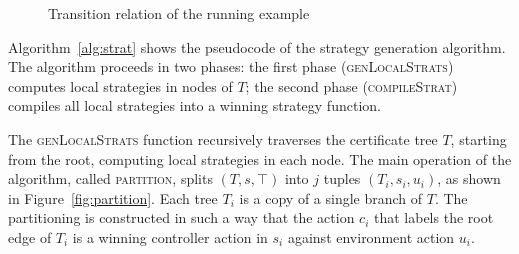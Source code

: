 
\begin{figure}
    \centering
    \caption{Transition relation of the running example}
    \label{fig:stratExample}
\end{figure}

Algorithm~\ref{alg:strat} shows the pseudocode of the strategy generation algorithm.  The algorithm proceeds in two phases: the first phase (\textsc{genLocalStrats}) computes local strategies in nodes of $T$; the second phase (\textsc{compileStrat}) compiles all local strategies into a winning strategy function.

The \textsc{genLocalStrats} function recursively traverses the certificate tree $T$, starting from the root, computing local strategies in each node.  The main operation of the algorithm, called \textsc{partition}, splits $(T, s, \top)$ into $j$ tuples $(T_i, s_i, u_i)$, as shown in Figure~\ref{fig:partition}.  Each tree $T_i$ is a copy of a single branch of $T$.  The partitioning is constructed in such a way that the action $c_i$ that labels the root edge of $T_i$ is a winning controller action in $s_i$ against environment action $u_i$.

